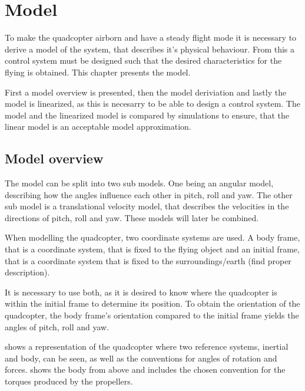 \chapter{Model}
To make the quadcopter airborn and have a steady flight mode it is necessary to derive a model of the system, that describes it's physical behaviour. From this a control system must be designed such that the desired characteristics for the flying is obtained. 
This chapter presents the model. 

First a model overview is presented, then the model deriviation and lastly the model is linearized, as this is necesarry to be able to design a control system. The model and the linearized model is compared by simulations to ensure, that the linear model is an acceptable model approximation.

\section{Model overview}
The model can be split into two sub models. One being an angular model, describing how the angles influence each other in pitch, roll and yaw. The other sub model is a translational velocity model, that describes the velocities in the directions of pitch, roll and yaw. These models will later be combined. 

When modelling the quadcopter, two coordinate systems are used. A body frame, that is a coordinate system, that is fixed to the flying object and an initial frame, that is a coordinate system that is fixed to the surroundings/earth (find proper description). 

It is necessary to use both, as it is desired to know where the quadcopter is within the initial frame to determine its position. To obtain the orientation of the quadcopter, the body frame's orientation compared to the initial frame yields the angles of pitch, roll and yaw. 

 


 shows a representation of the quadcopter where two reference systems, inertial and body, can be seen, as well as the conventions for angles of rotation and forces.  shows the body from above and includes the chosen convention for the torques produced by the propellers.

